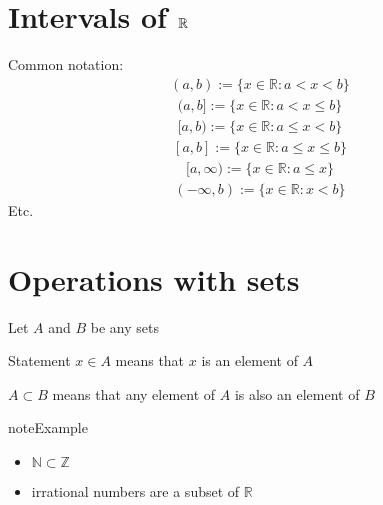 \documentclass[letterpaper,10pt,english]{jupyterBook}
\begin{document}
\section{Intervals of \protect\(\mathbb{R}\protect\)}
\label{\detokenize{03.set_theory:intervals-of-mathbb-r}}
\sphinxAtStartPar
Common notation:
\begin{equation*}
\begin{split}
(a, b)  := \{ x \in \mathbb{R} : a < x < b \}
\end{split}
\end{equation*}\begin{equation*}
\begin{split}
(a, b]  := \{ x \in \mathbb{R} : a < x \leq b \}
\end{split}
\end{equation*}\begin{equation*}
\begin{split}
[a, b)  := \{ x \in \mathbb{R} : a \leq x < b \}
\end{split}
\end{equation*}\begin{equation*}
\begin{split}
[a, b]  := \{ x \in \mathbb{R} : a \leq x \leq b \}
\end{split}
\end{equation*}\begin{equation*}
\begin{split}
[a, \infty) := \{ x \in \mathbb{R} : a \leq x  \}
\end{split}
\end{equation*}\begin{equation*}
\begin{split}
(-\infty, b) := \{ x \in \mathbb{R} :  x < b  \}
\end{split}
\end{equation*}
\sphinxAtStartPar
Etc.


\section{Operations with sets}
\label{\detokenize{03.set_theory:operations-with-sets}}
\sphinxAtStartPar
Let \(A\) and \(B\) be any sets

\sphinxAtStartPar
Statement \(x \in A\) means that \(x\) is an element of \(A\)

\sphinxAtStartPar
\(A \subset B\) means that any element of \(A\) is also an element of \(B\)

\begin{sphinxadmonition}{note}{Example}
\begin{itemize}
\item {} 
\sphinxAtStartPar
\(\mathbb{N} \subset \mathbb{Z}\)

\item {} 
\sphinxAtStartPar
irrational numbers are a subset of \(\mathbb{R}\)

\end{itemize}
\end{sphinxadmonition}
\end{document}
